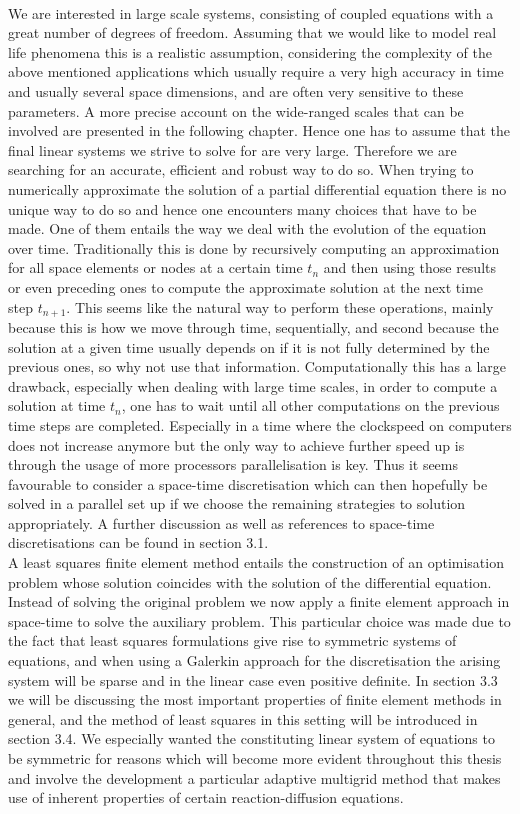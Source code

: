 \documentclass[../draft_1.tex]{subfiles}
\begin{document}
\smallskip
\\
We are interested in large scale systems, consisting of coupled equations with a great number of degrees of freedom. Assuming that we would like to model real life phenomena this is a realistic assumption, considering the complexity of the above mentioned applications which usually require a very high accuracy in time and usually several space dimensions, and are often very sensitive to these parameters. A more precise account on the wide-ranged scales that can be involved are presented in the following chapter. Hence one has to assume that the final linear systems we strive to solve for are very large. Therefore we are searching for an accurate, efficient and robust way to do so. When trying to numerically approximate the solution of a partial differential equation there is no unique way to do so and hence one encounters many choices that have to be made. One of them entails the way we deal with the evolution of the equation over time. Traditionally this is done by recursively computing an approximation for all space elements or nodes at a certain time $t_n$ and then using those results or even preceding ones to compute the approximate solution at the next time step $t_{n+1}$. This seems like the natural way to perform these operations, mainly because this is how we move through time, sequentially, and second because the solution at a given time usually depends on if it is not fully determined by the previous ones, so why not use that information. Computationally this has a large drawback, especially when dealing with large time scales, in order to compute a solution at time $t_n$, one has to wait until all other computations on the previous time steps are completed. Especially in a time where the clockspeed on computers does not increase anymore but the only way to achieve further speed up is through the usage of more processors parallelisation is key. Thus it seems favourable to  consider a space-time discretisation which can then hopefully be solved in a parallel set up if we choose the remaining strategies to solution appropriately. A further discussion as well as references to space-time discretisations can be found in section 3.1. 
\smallskip
\\ 
A least squares finite element method entails the construction of an optimisation problem whose solution coincides with the solution of the differential equation. Instead of solving the original problem we now apply a finite element approach in space-time to solve the auxiliary problem. This particular choice was made due to the fact that least squares formulations give rise to symmetric systems of equations, and when using a Galerkin approach for the discretisation the arising system will be sparse and in the linear case even positive definite. In section 3.3 we will be discussing the most important properties of finite element methods in general, and the method of least squares in this setting will be introduced in section 3.4. We especially wanted the constituting linear system of equations to be symmetric for reasons which will become more evident throughout this thesis and involve the development a particular adaptive multigrid method that makes use of inherent properties of certain reaction-diffusion equations.
\end{document}
